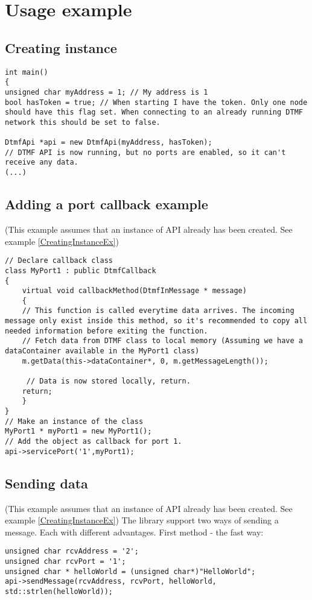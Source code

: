 \chapter{Usage example}
\section{Creating instance}
\begin{lstlisting}[float=htb,language={[ANSI]C++},caption={Creating instance example},label=CreatingInstanceEx]
int main()
{
unsigned char myAddress = 1; // My address is 1
bool hasToken = true; // When starting I have the token. Only one node should have this flag set. When connecting to an already running DTMF network this should be set to false.

DtmfApi *api = new DtmfApi(myAddress, hasToken);
// DTMF API is now running, but no ports are enabled, so it can't receive any data.
(...)
\end{lstlisting}

\section{Adding a port callback example}
(This example assumes that an instance of API already has been created. See example \ref{CreatingInstanceEx})
\begin{lstlisting}[float=htb,language={[ANSI]C++},caption={Adding a port callback example},label=CreatingCallbackEx]
// Declare callback class
class MyPort1 : public DtmfCallback
{
	virtual void callbackMethod(DtmfInMessage * message)
	{
    // This function is called everytime data arrives. The incoming message only exist inside this method, so it's recommended to copy all needed information before exiting the function.
    // Fetch data from DTMF class to local memory (Assuming we have a dataContainer available in the MyPort1 class)
    m.getData(this->dataContainer*, 0, m.getMessageLength());
    
     // Data is now stored locally, return.
    return;
	}
}
// Make an instance of the class
MyPort1 * myPort1 = new MyPort1();
// Add the object as callback for port 1.
api->servicePort('1',myPort1);
\end{lstlisting}


\section{Sending data}
(This example assumes that an instance of API already has been created. See example \ref{CreatingInstanceEx})
The library support two ways of sending a message. Each with different advantages.
First method - the fast way:
\begin{lstlisting}[float=htb,language={[ANSI]C++},caption={Sending data example 1},label=SendingDataEx1]
unsigned char rcvAddress = '2';
unsigned char rcvPort = '1';
unsigned char * helloWorld = (unsigned char*)"HelloWorld";
api->sendMessage(rcvAddress, rcvPort, helloWorld, std::strlen(helloWorld));
\end{lstlisting}

